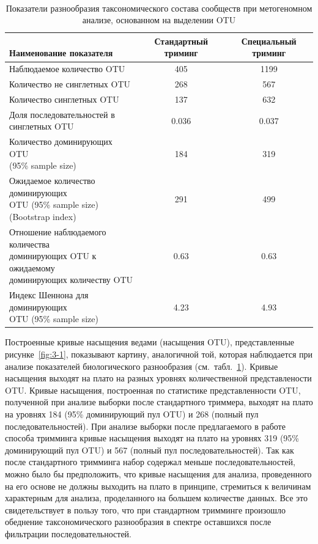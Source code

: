 \documentclass[a4paper,12pt,openany,final]{extreport}
\def\oldcaption{} \let\oldcaption=\caption
\def\caption{\stepcounter{captionsnum}\oldcaption}
\newcommand\T{\rule{0pt}{2.6ex}}       %
\begin{document}
\begin{table}
  \centering
\caption{Показатели разнообразия таксономического состава сообществ
при метогеномном анализе, основанном на выделении OTU}\label{table:3-1}

{\tt\small
\begin{tabular}[]{|>{\rm\raggedright}p{}|c|c|}
  \hline
\makecell[cc]{\rm\bfseries\\[-0.3em]\bf{}Наименование показателя} & \multicolumn{1}{p{3cm}|}{\rm\centering\bfseries Стандартный триминг} &
\multicolumn{1}{p{3cm}|}{\rmfamily\centering\bfseries{}Специальный триминг}\tabularnewline\hline
\T Наблюдаемое количество OTU & 405 & 1199\tabularnewline\hline
Количество не синглетных OTU & 268 & 567\tabularnewline\hline
Количество синглетных OTU & 137 & 632\tabularnewline\hline
\makecell[cl]{Доля последовательностей в\\ синглетных OTU} &\multirow{1}{*}{0.036} &\multirow{1}{*}{0.037}\tabularnewline\hline
\makecell[cl]{Количество доминирующих OTU\\
(95\% sample size)} &\multirow{1}{*}{184}&\multirow{1}{*}{319}
\tabularnewline\hline
\makecell[cl]{Ожидаемое количество доминирующих\\ OTU (95\% sample size)\\ (Bootstrap index)}&\multirow{1}{*}{291}&\multirow{1}{*}{499}\\\hline
\makecell[cl]{Отношение наблюдаемого количества\\ доминирующих OTU к ожидаемому\\
доминирующих количеству OTU} &\multirow{1}{*}{0.63} &\multirow{1}{*}{0.63}\tabularnewline\hline
\makecell[cl]{Индекс Шеннона для доминирующих\\ OTU
(95\% sample size)}&\multirow{1}{*}{4.23}&\multirow{1}{*}{4.93}\\
\hline
\end{tabular}}
\end{table}


Построенные кривые насыщения ведами (насыщения OTU), представленные
рисунке~\ref{fig:3-1}, показывают картину, аналогичной той, которая наблюдается при
анализе показателей биологического разнообразия (см.~табл.~\ref{table:3-1}). Кривые
насыщения выходят на плато на разных уровнях количественной
представлености OTU. Кривые насыщения, построенная по статистике
представленности OTU, полученной при анализе выборки после стандартного
триммера, выходят на плато на уровнях 184 (95\% доминирующий пул OTU) и
268 (полный пул последовательностей). При анализе выборки после
предлагаемого в работе способа тримминга кривые насыщения выходят на
плато на уровнях 319 (95\% доминирующий пул OTU) и 567 (полный пул
последовательностей). Так как после стандартного тримминга набор
содержал меньше последовательностей, можно было бы предположить, что
кривые насыщения для анализа, проведенного на его основе не должны
выходить на плато в принципе, стремиться к величинам характерным для
анализа, проделанного на большем количестве данных. Все это
свидетельствует в пользу того, что при стандартном тримминге произошло
обеднение таксономического разнообразия в спектре оставшихся после
фильтрации последовательностей.
\end{document}
